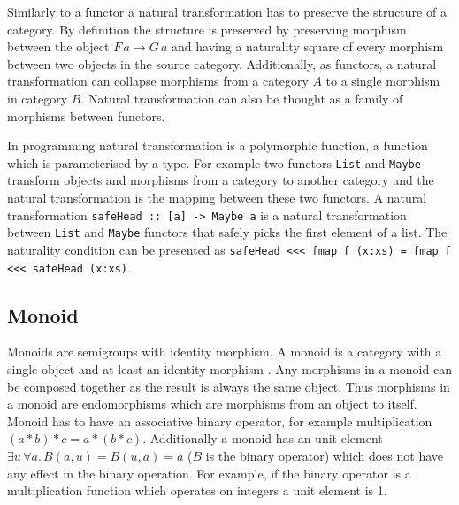 \documentclass[article]{aaltoseries}
\begin{document}
    Similarly to a functor a natural transformation has to preserve the
    structure of a category. By definition the structure is preserved by
    preserving morphism between the object $F\, a \rightarrow G\, a$ and having a
    naturality square of every morphism between two objects in the source
    category. Additionally, as functors, a natural transformation can collapse
    morphisms from a category $A$ to a single morphism in category $B$. Natural
    transformation can also be thought as a family of morphisms between functors.
 
    In programming natural transformation is a polymorphic function, a function
    which is parameterised by a type. For example two functors \lstinline|List|
    and \lstinline|Maybe| transform objects and morphisms from a category to
    another category and the natural transformation is the mapping between these
    two functors. A natural transformation
    \lstinline|safeHead :: [a] -> Maybe a| is a natural transformation between
    \lstinline|List| and \lstinline|Maybe| functors that safely picks the first
    element of a list. The naturality condition can be presented as
    \lstinline|safeHead <<< fmap f (x:xs) = fmap f <<< safeHead (x:xs)|.

    
  \subsection{Monoid}
    Monoids are semigroups with identity morphism. A monoid is a category with a
    single object and at least an identity morphism \cite{awodey2006category,
      barr1990category, mac2013categories, yorgey2012monoids}. Any morphisms
    in a monoid can be composed together as the result is always the same
    object. Thus morphisms in a monoid are endomorphisms which are morphisms
    from an object to itself. Monoid has to have an associative binary operator,
    for example multiplication $(a * b) * c = a * (b * c)$. Additionally a
    monoid has an unit element $\exists u\,\forall a.\, B(a,u) = B(u,a) = a$ ($B$
    is the binary operator) which does not have any effect in the binary
    operation. For example, if the binary operator is a multiplication function
    which operates on integers a unit element is 1.

\end{document}
